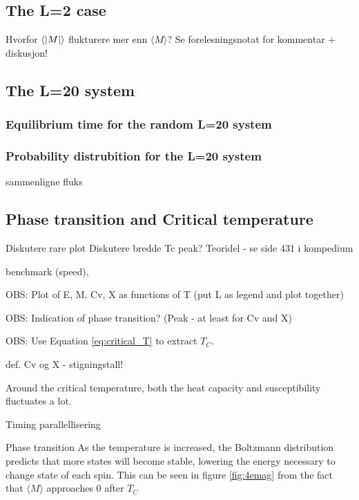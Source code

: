 



\subsection{The L=2 case}

Hvorfor $ \langle \abs{M} \rangle $ flukturere mer enn $ \langle {M} \rangle $?
	Se forelesningsnotat for kommentar + diskusjon!
\subsection{The L=20 system}






\subsubsection{Equilibrium time  for the random L=20 system}



\subsubsection{Probability distrubition  for the L=20 system}

sammenligne fluks

\subsection{Phase transition and Critical temperature}

Diskutere rare plot
Diskutere bredde Tc peak? Teoridel - se side 431 i kompedium

benchmark (speed),

OBS: Plot of E, M, Cv, X as functions of T (put L as legend and plot together)

OBS: Indication of phase transition? (Peak - at least for Cv and X)

OBS: Use Equation \ref{eq:critical_T} to extract $T_C$.

def. Cv og X - stigningstall!

Around the critical temperature, both the heat capacity and susceptibility fluctuates a lot. 

Timing parallellisering





Phase transition
As the temperature is increased, the Boltzmann distribution predicts that more states will become stable, lowering the energy necessary to change state of each spin. This can be seen  in figure \ref{fig:4emag} from the fact that $ \langle M \rangle $ approaches 0 after $ T_C $
